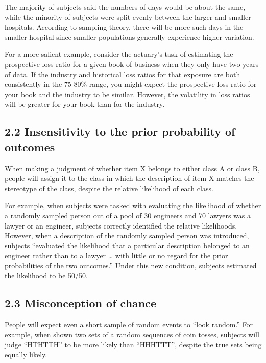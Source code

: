 \documentclass[
]{article}
\begin{document}
The majority of subjects said the numbers of days would be about the
same, while the minority of subjects were split evenly between the
larger and smaller hospitals. According to sampling theory, there will
be more such days in the smaller hospital since smaller populations
generally experience higher variation.

For a more salient example, consider the actuary's task of estimating
the prospective loss ratio for a given book of business when they only
have two years of data. If the industry and historical loss ratios for
that exposure are both consistently in the 75-80\% range, you might
expect the prospective loss ratio for your book and the industry to be
similar. However, the volatility in loss ratios will be greater for your
book than for the industry.

\hypertarget{insensitivity-to-the-prior-probability-of-outcomes}{%
\subsection{2.2 Insensitivity to the prior probability of
outcomes}\label{insensitivity-to-the-prior-probability-of-outcomes}}

When making a judgment of whether item X belongs to either class A or
class B, people will assign it to the class in which the description of
item X matches the stereotype of the class, despite the relative
likelihood of each class.

For example, when subjects were tasked with evaluating the likelihood of
whether a randomly sampled person out of a pool of 30 engineers and 70
lawyers was a lawyer or an engineer, subjects correctly identified the
relative likelihoods. However, when a description of the randomly
sampled person was introduced, subjects ``evaluated the likelihood that
a particular description belonged to an engineer rather than to a lawyer
\ldots{} with little or no regard for the prior probabilities of the two
outcomes.'' Under this new condition, subjects estimated the likelihood
to be 50/50.

\hypertarget{misconception-of-chance}{%
\subsection{2.3 Misconception of chance}\label{misconception-of-chance}}

People will expect even a short sample of random events to ``look
random.'' For example, when shown two sets of a random sequences of coin
tosses, subjects will judge ``HTHTTH'' to be more likely than
``HHHTTT'', despite the true sets being equally likely.
\end{document}
